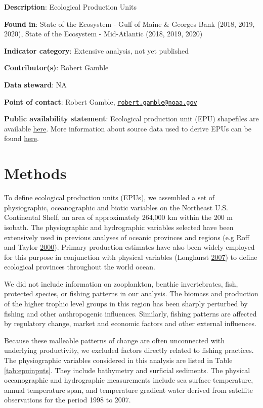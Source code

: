 \documentclass[
]{book}
\begin{document}
\textbf{Description}: Ecological Production Units

\textbf{Found in}: State of the Ecosystem - Gulf of Maine \& Georges Bank (2018, 2019, 2020), State of the Ecosystem - Mid-Atlantic (2018, 2019, 2020)

\textbf{Indicator category}: Extensive analysis, not yet published

\textbf{Contributor(s)}: Robert Gamble

\textbf{Data steward}: NA

\textbf{Point of contact}: Robert Gamble, \href{mailto:robert.gamble@noaa.gov}{\nolinkurl{robert.gamble@noaa.gov}}

\textbf{Public availability statement}: Ecological production unit (EPU) shapefiles are available \href{https://github.com/NOAA-EDAB/tech-doc/tree/master/gis}{here}. More information about source data used to derive EPUs can be found \href{https://www.integratedecosystemassessment.noaa.gov/sites/default/files/pdf/ne-ecological-production-units-paper.pdf}{here}.

\hypertarget{methods-13}{%
\section{Methods}\label{methods-13}}

To define ecological production units (EPUs), we assembled a set of physiographic, oceanographic and biotic variables on the Northeast U.S. Continental Shelf, an area of approximately 264,000 km within the 200 m isobath. The physiographic and hydrographic variables selected have been extensively used in previous analyses of oceanic provinces and regions (e.g Roff and Taylor \protect\hyperlink{ref-Roff2000}{2000}). Primary production estimates have also been widely employed for this purpose in conjunction with physical variables (Longhurst \protect\hyperlink{ref-Longhurst2007}{2007}) to define ecological provinces throughout the world ocean.

We did not include information on zooplankton, benthic invertebrates, fish, protected species, or fishing patterns in our analysis. The biomass and production of the higher trophic level groups in this region has been sharply perturbed by fishing and other anthropogenic influences. Similarly, fishing patterns are affected by regulatory change, market and economic factors and other external influences.

Because these malleable patterns of change are often unconnected with underlying productivity, we excluded factors directly related to fishing practices. The physiographic variables considered in this analysis are listed in Table \ref{tab:epuinputs}. They include bathymetry and surficial sediments. The physical oceanographic and hydrographic measurements include sea surface temperature, annual temperature span, and temperature gradient water derived from satellite observations for the period 1998 to 2007.
\end{document}
